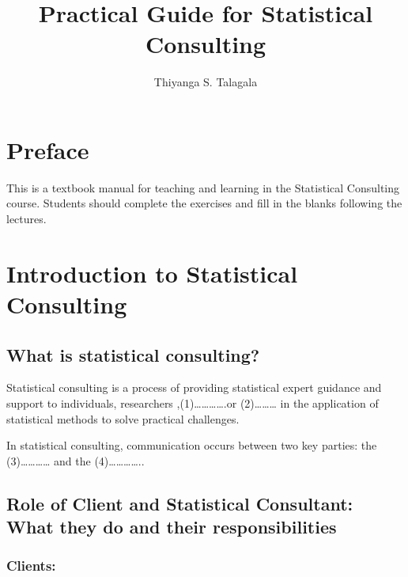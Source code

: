 \documentclass[
  letterpaper,
  DIV=11,
  numbers=noendperiod]{scrreprt}
\title{Practical Guide for Statistical Consulting}
\author{Thiyanga S. Talagala}
\date{}
\renewcommand*\contentsname{Table of contents}
\newcommand\contentsname{Table of contents}
\begin{document}
\maketitle

\renewcommand*\contentsname{Table of contents}
{
\hypersetup{linkcolor=}
\setcounter{tocdepth}{2}
\tableofcontents
}


\chapter*{Preface}\label{preface}


This is a textbook manual for teaching and learning in the Statistical
Consulting course. Students should complete the exercises and fill in
the blanks following the lectures.


\chapter{Introduction to Statistical
Consulting}\label{introduction-to-statistical-consulting}

\section{What is statistical
consulting?}\label{what-is-statistical-consulting}

Statistical consulting is a process of providing statistical expert
guidance and support to individuals, researchers
,(1)\ldots\ldots\ldots\ldots.or (2)\ldots\ldots\ldots{} in the
application of statistical methods to solve practical challenges.

In statistical consulting, communication occurs between two key parties:
the (3)\ldots\ldots\ldots\ldots{} and the (4)\ldots\ldots\ldots\ldots..

\section{Role of Client and Statistical Consultant: What they do and
their
responsibilities}\label{role-of-client-and-statistical-consultant-what-they-do-and-their-responsibilities}

\subsection{Clients:}\label{clients}
\end{document}
